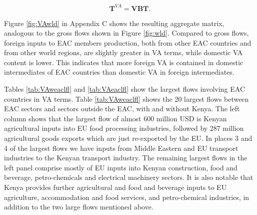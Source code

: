 \documentclass[a4paper]{article}
\begin{document}
\begin{equation}
\textbf{T}^{VA} = \textbf{VB} \textbf{T}.
\end{equation} 

Figure \ref{fig:VAwld} in Appendix C shows the resulting aggregate matrix, analogous to the gross flows shown in Figure \ref{fig:wld}. Compared to gross flows, foreign inputs to EAC members production, both from other EAC countries and from other world regions, are slightly greater in VA terms, while domestic VA content is lower. This indicates that more foreign VA is contained in domestic intermediates of EAC countries than domestic VA in foreign intermediates. \newline

Tables \ref{tab:VAweaclfl} and \ref{tab:VAeaclfl} show the largest flows involving EAC countries in VA terms. %
Table \ref{tab:VAweaclfl} shows the 20 largest flows between EAC sectors and sectors outside the EAC, with and without Kenya. The left column shows that the largest flow of almost 600 million USD is Kenyan agricultural inputs into EU food processing industries, followed by 287 million agricultural goods exports which are just re-exported by the EU. In places 3 and 4 of the largest flows we have inputs from Middle Eastern and EU transport industries to the Kenyan transport industry. The remaining largest flows in the left panel comprise mostly of EU inputs into Kenyan construction, food and beverage, petro-chemicals and electrical machinery sectors. It is also notable that Kenya provides further agricultural and food and beverage inputs to EU agriculture, accommodation and food services, and petro-chemical industries, in addition to the two large flows mentioned above. \newline
\end{document}
